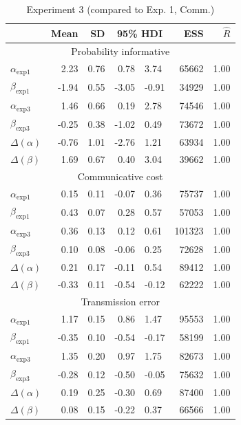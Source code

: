\documentclass[doc,biblatex]{apa7}
\begin{document}
\begin{table}[h]
\begin{center}
\begin{threeparttable}
\caption{Experiment 3 (compared to Exp. 1, Comm.)}
\footnotesize
\begin{tabular}{lrrrlrr}
\toprule
 & Mean & SD & \multicolumn{2}{c}{95\% HDI} & ESS & $\hat{R}$ \\
\midrule
\multicolumn{7}{c}{Probability informative} \\
$\alpha_\mathrm{exp1}$ & 2.23 & 0.76 & 0.78 & 3.74 & 65662 & 1.00 \\
$\beta_\mathrm{exp1}$ & -1.94 & 0.55 & -3.05 & -0.91 & 34929 & 1.00 \\
$\alpha_\mathrm{exp3}$ & 1.46 & 0.66 & 0.19 & 2.78 & 74546 & 1.00 \\
$\beta_\mathrm{exp3}$ & -0.25 & 0.38 & -1.02 & 0.49 & 73672 & 1.00 \\
$\Delta(\alpha)$ & -0.76 & 1.01 & -2.76 & 1.21 & 63934 & 1.00 \\
$\Delta(\beta)$ & 1.69 & 0.67 & 0.40 & 3.04 & 39662 & 1.00 \\
\midrule
\multicolumn{7}{c}{Communicative cost} \\
$\alpha_\mathrm{exp1}$ & 0.15 & 0.11 & -0.07 & 0.36 & 75737 & 1.00 \\
$\beta_\mathrm{exp1}$ & 0.43 & 0.07 & 0.28 & 0.57 & 57053 & 1.00 \\
$\alpha_\mathrm{exp3}$ & 0.36 & 0.13 & 0.12 & 0.61 & 101323 & 1.00 \\
$\beta_\mathrm{exp3}$ & 0.10 & 0.08 & -0.06 & 0.25 & 72628 & 1.00 \\
$\Delta(\alpha)$ & 0.21 & 0.17 & -0.11 & 0.54 & 89412 & 1.00 \\
$\Delta(\beta)$ & -0.33 & 0.11 & -0.54 & -0.12 & 62222 & 1.00 \\
\midrule
\multicolumn{7}{c}{Transmission error} \\
$\alpha_\mathrm{exp1}$ & 1.17 & 0.15 & 0.86 & 1.47 & 95553 & 1.00 \\
$\beta_\mathrm{exp1}$ & -0.35 & 0.10 & -0.54 & -0.17 & 58199 & 1.00 \\
$\alpha_\mathrm{exp3}$ & 1.35 & 0.20 & 0.97 & 1.75 & 82673 & 1.00 \\
$\beta_\mathrm{exp3}$ & -0.28 & 0.12 & -0.50 & -0.05 & 75632 & 1.00 \\
$\Delta(\alpha)$ & 0.19 & 0.25 & -0.30 & 0.69 & 87400 & 1.00 \\
$\Delta(\beta)$ & 0.08 & 0.15 & -0.22 & 0.37 & 66566 & 1.00 \\
\bottomrule
\end{tabular}
\label{exp3_parameter_estimates}
\end{threeparttable}
\end{center}
\end{table}
\end{document}

